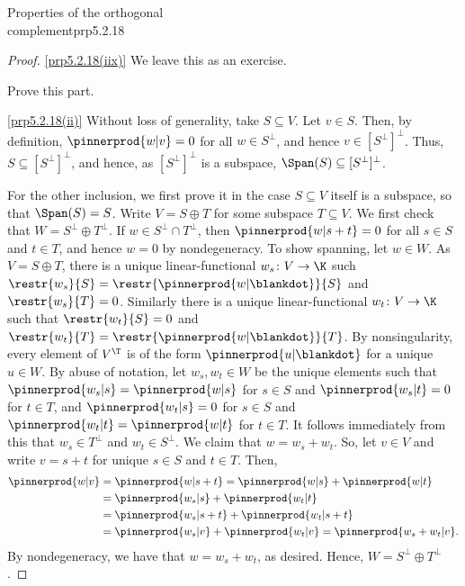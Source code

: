 \begin{prp}{Properties of the orthogonal \\ complement}{prp5.2.18}
\begin{proof}
		\blni
		\cref{prp5.2.18(iix)} We leave this as an exercise.
		\begin{exr}[breakable=false]{}{}
			Prove this part.
		\end{exr}
		
		\blni
		\cref{prp5.2.18(ii)} Without loss of generality, take $S\subseteq V$.  Let $v\in S$.  Then, by definition, $\pinnerprod{w|v}=0$ for all $w\in S^{\perp}$, and hence $v\in [S^{\perp}]^{\perp}$.  Thus, $S\subseteq [S^{\perp}]^{\perp}$, and hence, as $[S^{\perp}]^{\perp}$ is a subspace, $\Span (S)\subseteq [S^{\perp}]^{\perp}$.
		
		For the other inclusion, we first prove it in the case $S\subseteq V$ itself is a subspace, so that $\Span (S)=S$.  Write $V=S\oplus T$ for some subspace $T\subseteq V$.  We first check that $W=S^{\perp}\oplus T^{\perp}$.  If $w\in S^{\perp}\cap T^{\perp}$, then $\pinnerprod{w|s+t}=0$ for all $s\in S$ and $t\in T$, and hence $w=0$ by nondegeneracy.  To show spanning, let $w\in W$.  As $V=S\oplus T$, there is a unique linear-functional $w_s\colon V\rightarrow \K$ such $\restr{w_s}{S}=\restr{\pinnerprod{w|\blankdot}}{S}$ and $\restr{w_s}{T}=0$.  Similarly there is a unique linear-functional $w_t\colon V\rightarrow \K$ such that $\restr{w_t}{S}=0$ and $\restr{w_t}{T}=\restr{\pinnerprod{w|\blankdot}}{T}$.  By nonsingularity, every element of $V^{\T}$ is of the form $\pinnerprod{u|\blankdot}$ for a unique $u\in W$.  By abuse of notation, let $w_s,w_t\in W$ be the unique elements such that $\pinnerprod{w_s|s}=\pinnerprod{w|s}$ for $s\in S$ and $\pinnerprod{w_s|t}=0$ for $t\in T$, and $\pinnerprod{w_t|s}=0$ for $s\in S$ and $\pinnerprod{w_t|t}=\pinnerprod{w|t}$ for $t\in T$.  It follows immediately from this that $w_s\in T^{\perp}$ and $w_t\in S^{\perp}$.  We claim that $w=w_s+w_t$.  So, let $v\in V$ and write $v=s+t$ for unique $s\in S$ and $t\in T$.  Then,
		\begin{equation}
			\begin{split}
				\pinnerprod{w|v} & =\pinnerprod{w|s+t}=\pinnerprod{w|s}+\pinnerprod{w|t} \\
				& =\pinnerprod{w_s|s}+\pinnerprod{w_t|t} \\
				& =\pinnerprod{w_s|s+t}+\pinnerprod{w_t|s+t} \\
				& =\pinnerprod{w_s|v}+\pinnerprod{w_t|v}=\pinnerprod{w_s+w_t|v}.
			\end{split}
		\end{equation}
		By nondegeneracy, we have that $w=w_s+w_t$, as desired.  Hence, $W=S^{\perp}\oplus T^{\perp}$.
		

\end{proof}
\end{prp}
